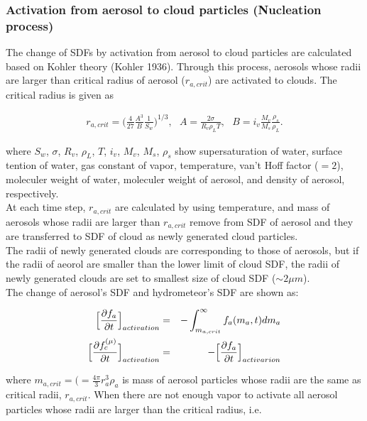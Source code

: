 \subsubsection{Activation from aerosol to cloud particles (Nucleation process)}
The change of SDFs by activation from aerosol to cloud particles are calculated based on Kohler theory (Kohler 1936). Through this process, aerosols whose radii are larger than critical radius of aerosol ($r_{a,crit}$) are activated to clouds. The critical radius is given as

\begin{eqnarray}
r_{a,crit}=\bigl( \frac{4}{27}\frac{A^{3}}{B}\frac{1}{S_{w}}\Bigr )^{1/3}, \:\:\:A=\frac{2\sigma}{R_{v}\rho_{L}T},\:\:\: B=i_{v}\frac{M_{v}}{M_{s}}\frac{\rho_{s}}{\rho_{L}}.
\end{eqnarray}

where $S_{w}$, $\sigma$, $R_{v}$, $\rho_{L}$, $T$, $i_{v}$, $M_{v}$, $M_{s}$, $\rho_{s}$ show supersaturation of water, surface tention of water, gas constant of vapor, temperature, van't Hoff factor ($=2$), moleculer weight of water, moleculer weight of aerosol, and density of aerosol, respectively.\\
At each time step, $r_{a,crit}$ are calculated by using temperature, and mass of aerosols whose radii are larger than $r_{a,crit}$ remove from SDF of aerosol and they are transferred to SDF of cloud as newly generated cloud particles.\\
The radii of newly generated clouds are corresponding to those of aerosols, but if the radii of aeorol are smaller than the lower limit of cloud SDF, the radii of newly generated clouds are set to smallest size of cloud SDF ($\sim 2 \mu m$).\\
The change of aerosol's SDF and hydrometeor's SDF are shown as:

\begin{eqnarray}
\Bigl[\frac{\partial f_{a}}{\partial t}\Bigr]_{activation}&=&-\int_{m_{a,crit}}^{\infty}f_{a}(m_{a},t)dm_{a}\\
\Bigl[\frac{\partial f_{c}^{(\mu)}}{\partial t}\Bigr]_{activation}&=&-\Bigl[\frac{\partial f_{a}}{\partial t}\Bigr]_{activarion}
\end{eqnarray}

where $m_{a,crit}=\bigl(=\frac{4\pi}{3}r_{a}^{3}\rho_{a}$ is mass of aerosol particles whose radii are the same as critical radii, $r_{a,crit}$. When there are not enough vapor to activate all aerosol particles whose radii are larger than the critical radius, i.e.

